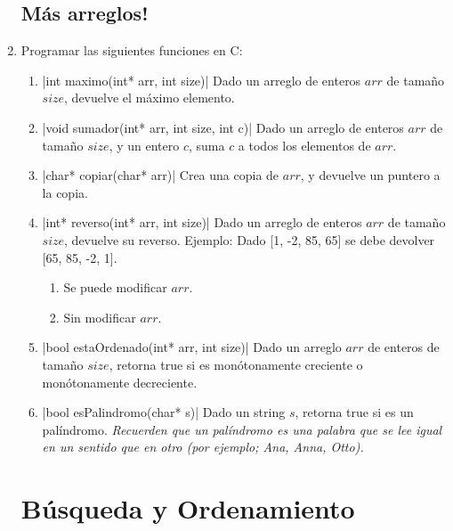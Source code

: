 \documentclass[titlepage,oneside]{book}
\begin{document}
\begin{enumerate}
    \subsection{Más arreglos!}

    \item Programar las siguientes funciones en C:
    \begin{enumerate}
        \item{}|int maximo(int* arr, int size)|
        Dado un arreglo de enteros $arr$ de tamaño $size$, devuelve el máximo elemento.

        \item{}|void sumador(int* arr, int size, int c)|
        Dado un arreglo de enteros $arr$ de tamaño $size$, y un entero $c$, suma $c$ a todos los elementos de $arr$.

        \item{}|char* copiar(char* arr)|
        Crea una copia de $arr$, y devuelve un puntero a la copia.
        
        \item{}|int* reverso(int* arr, int size)|
        Dado un arreglo de enteros $arr$ de tamaño $size$, devuelve su reverso. \newline
        Ejemplo: Dado [1, -2, 85, 65] se debe devolver [65, 85, -2, 1].
        \begin{enumerate}
            \item Se puede modificar $arr$.
            \item Sin modificar $arr$.
        \end{enumerate}

        \item{}|bool estaOrdenado(int* arr, int size)|
        Dado un arreglo $arr$ de enteros de tamaño $size$, retorna true si es monótonamente creciente o monótonamente decreciente.

        \item{}|bool esPalindromo(char* s)|
        Dado un string $s$, retorna true si es un palíndromo. \textit{Recuerden que un palíndromo es una palabra que se lee igual en un sentido que en otro (por ejemplo; Ana, Anna, Otto).}
    \end{enumerate}

    \section{Búsqueda y Ordenamiento}


\end{enumerate}
\end{document}
